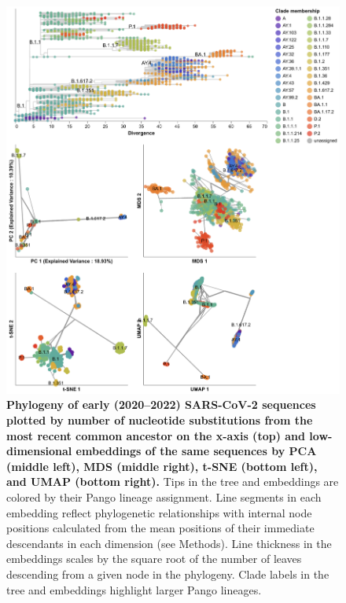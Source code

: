 \begin{figure}[!h]
\includegraphics[width=\columnwidth]{figures/sarscov2-embeddings-by-Nextclade_pango_collapsed-clade.png}
\caption{{\bf Phylogeny of early (2020--2022) SARS-CoV-2 sequences plotted by number of nucleotide substitutions from the most recent common ancestor on the x-axis (top) and low-dimensional embeddings of the same sequences by PCA (middle left), MDS (middle right), t-SNE (bottom left), and UMAP (bottom right).}
  Tips in the tree and embeddings are colored by their Pango lineage assignment.
  Line segments in each embedding reflect phylogenetic relationships with internal node positions calculated from the mean positions of their immediate descendants in each dimension (see Methods).
  Line thickness in the embeddings scales by the square root of the number of leaves descending from a given node in the phylogeny.
  Clade labels in the tree and embeddings highlight larger Pango lineages.
}\label{S_Fig_sarscov2_early_embeddings_by_Nextclade_pango}
\end{figure}

